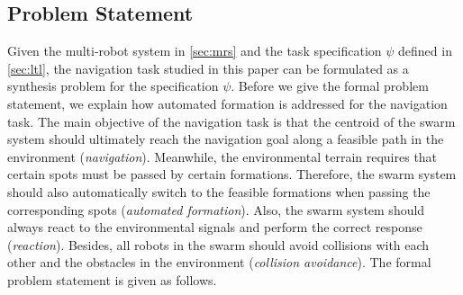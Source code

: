 \documentclass[letterpaper, 10 pt, conference]{ieeeconf}
\begin{document}


\subsection{Problem Statement}\label{sec:probstate}

Given the multi-robot system in \eqref{sec:mrs} and the task specification $\psi$ defined in \eqref{sec:ltl}, the navigation task studied in this paper can be formulated as a synthesis problem for the specification $\psi$. Before we give the formal problem statement, we explain how automated formation is addressed for the navigation task. The main objective of the navigation task is that the centroid of the swarm system should ultimately reach the navigation goal along a feasible path in the environment (\textit{navigation}). Meanwhile, the environmental terrain requires that certain spots must be passed by certain formations. Therefore, the swarm system should also automatically switch to the feasible formations when passing the corresponding spots (\textit{automated formation}). Also, the swarm system should always react to the environmental signals and perform the correct response (\textit{reaction}). Besides, all robots in the swarm should avoid collisions with each other and the obstacles in the environment (\textit{collision avoidance}). The formal problem statement is given as follows.

\end{document}
